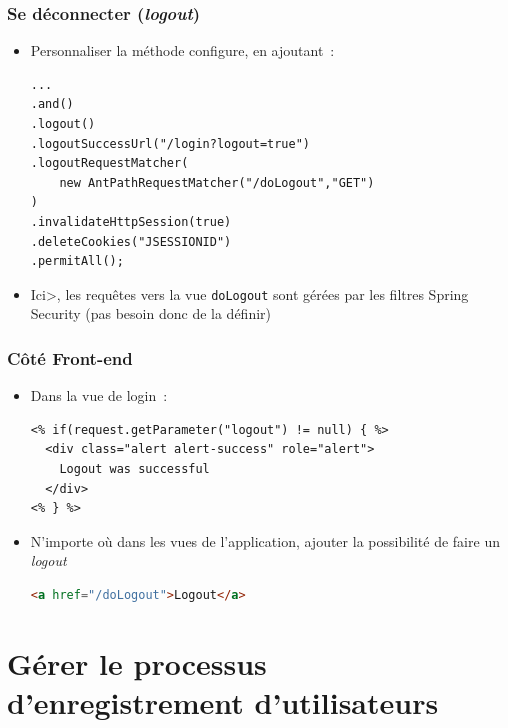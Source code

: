 \documentclass{beamer}
\begin{document}
\begin{frame}[fragile]
	\frametitle{Se déconnecter (\textit{logout})}
	\begin{itemize}
		\item Personnaliser la méthode configure, en ajoutant~:
\begin{lstlisting}
...
.and()
.logout()
.logoutSuccessUrl("/login?logout=true")
.logoutRequestMatcher(
	new AntPathRequestMatcher("/doLogout","GET")
)
.invalidateHttpSession(true)
.deleteCookies("JSESSIONID")
.permitAll();
\end{lstlisting}
\item Ici>, les requêtes vers la vue \texttt{doLogout} sont gérées par les filtres Spring Security (pas besoin donc de la définir)
	\end{itemize}
\end{frame}

\begin{frame}[fragile]
	\frametitle{Côté Front-end}
	\begin{itemize}
		\item Dans la vue de login~:
\begin{lstlisting}
<% if(request.getParameter("logout") != null) { %>
  <div class="alert alert-success" role="alert">
  	Logout was successful
  </div>
<% } %>
\end{lstlisting}
		\item N'importe où dans les vues de l'application, ajouter la possibilité de faire un \textit{logout}
\begin{lstlisting}[language=Html]
<a href="/doLogout">Logout</a>
\end{lstlisting}				
		
	\end{itemize}
\end{frame}

\section{Gérer le processus d'enregistrement d'utilisateurs}
\end{document}
